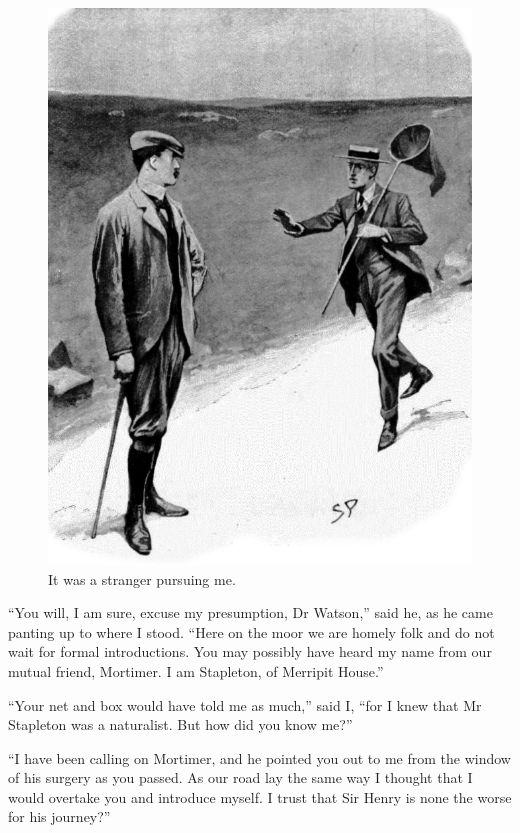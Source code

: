\documentclass[paper=5.5in:8.5in,BCOR=7mm,twoside,DIV=calc,12pt,usegeometry,openany,chapterprefix,endperiod,headings=big]{scrbook} %
\begin{document}
\begin{figure}[tbhp]
\centering
\includegraphics[width=\linewidth]{07_stranger}
\caption{It was a stranger pursuing me.}
\end{figure}

\enquote{You will, I am sure, excuse my presumption, Dr Watson,} said he, as he came panting up to where I stood. \enquote{Here on the moor we are homely folk and do not wait for formal introductions. You may possibly have heard my name from our mutual friend, Mortimer. I am Stapleton, of Merripit House.}

\enquote{Your net and box would have told me as much,} said I, \enquote{for I knew that Mr Stapleton was a naturalist. But how did you know me?}

\enquote{I have been calling on Mortimer, and he pointed you out to me from the window of his surgery as you passed. As our road lay the same way I thought that I would overtake you and introduce myself. I trust that Sir Henry is none the worse for his journey?}
\end{document}
